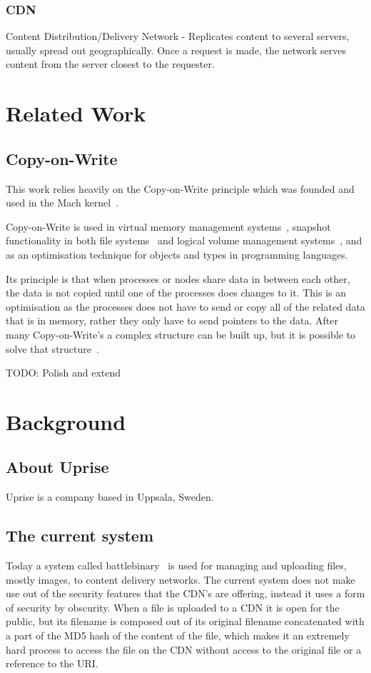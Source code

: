\documentclass[a4paper,12pt]{article}
\begin{document}
\subsubsection{CDN}
Content Distribution/Delivery Network - Replicates content to several servers, usually spread out geographically. Once a 
request is made, the network serves content from the server closest to the requester.

\section{Related Work}
\subsection{Copy-on-Write}
This work relies heavily on the Copy-on-Write principle which was founded and used in the Mach kernel~\cite{COPYONWRITE}. 

Copy-on-Write is used in virtual memory management systems~\cite{VIRTCOW}, snapshot functionality in both file 
systems~\cite{BTRFS} and logical volume management systems~\cite{LVMCOW}, and as an optimisation technique for objects and 
types in programming languages\cite{LANGCOW}.

Its principle is that when processes or nodes share data in between each other, the data is not copied until one of the 
processes does changes to it. This is an optimisation as the processes does not have to send or copy all of the related 
data that is in memory, rather they only have to send pointers to the data. After many Copy-on-Write's a complex structure 
can be built up, but it is possible to solve that structure~\cite{COPYONWRITE2}.

TODO: Polish and extend

\section{Background}
\subsection{About Uprise}
Uprise is a company based in Uppsala, Sweden. 

\subsection{The current system}
Today a system called battlebinary~\cite{BATTLEBINARY} is used for managing and uploading files, mostly images, to content 
delivery networks. The current system does not make use out of the security features that the CDN's are offering, instead it 
uses a form of security by obscurity. When a file is uploaded to a CDN it is open for the public, but its filename is 
composed out of its original filename concatenated with a part of the MD5 hash of the content of the file, which makes it an 
extremely hard process to access the file on the CDN without access to the original file or a reference to the URI.
\end{document}
